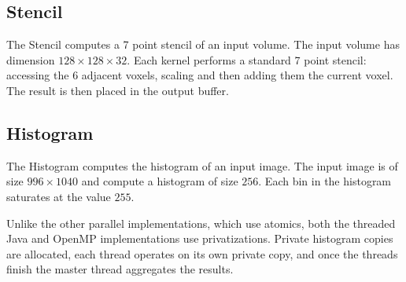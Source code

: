 \subsection{Stencil}

The Stencil computes a 7 point stencil of an input volume. 
The input volume has dimension $128 \times 128 \times 32$.
Each kernel performs a standard 7 point stencil: accessing the $6$ adjacent voxels,
	scaling and then adding them the current voxel.
The result is then placed in the output buffer.

\subsection{Histogram}

The Histogram computes the histogram of an input image.
The input image is of size $996 \times 1040$ and compute a 
	histogram of size $256$.
Each bin in the histogram saturates at the value $255$.

Unlike the other parallel implementations, which use atomics, both the
	threaded Java and OpenMP implementations use privatizations.
Private histogram copies are allocated, each thread 
	operates on its own private copy, and once the threads finish the
	master thread aggregates the results.


